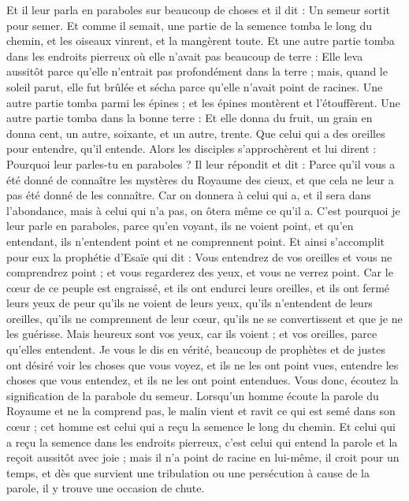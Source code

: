 \begin{multicols}{2}
Et il leur parla en paraboles sur beaucoup de choses et il dit : Un semeur sortit pour semer.
Et comme il semait, une partie de la semence tomba le long du chemin, et les oiseaux vinrent, et la mangèrent toute.
Et une autre partie tomba dans les endroits pierreux où elle n'avait pas beaucoup de terre : Elle leva aussitôt parce qu'elle n'entrait pas profondément dans la terre ;
mais, quand le soleil parut, elle fut brûlée et sécha parce qu'elle n'avait point de racines.
Une autre partie tomba parmi les épines ; et les épines montèrent et l'étouffèrent.
Une autre partie tomba dans la bonne terre : Et elle donna du fruit, un grain en donna cent, un autre, soixante, et un autre, trente.
Que celui qui a des oreilles pour entendre, qu'il entende.
Alors les disciples s'approchèrent et lui dirent : Pourquoi leur parles-tu en paraboles ?
Il leur répondit et dit : Parce qu'il vous a été donné de connaître les mystères du Royaume des cieux, et que cela ne leur a pas été donné de les connaître.
Car on donnera à celui qui a, et il sera dans l'abondance, mais à celui qui n'a pas, on ôtera même ce qu'il a.
C'est pourquoi je leur parle en paraboles, parce qu'en voyant, ils ne voient point, et qu'en entendant, ils n'entendent point et ne comprennent point.
Et ainsi s'accomplit pour eux la prophétie d'Esaïe qui dit : Vous entendrez de vos oreilles et vous ne comprendrez point ; et vous regarderez des yeux, et vous ne verrez point.
Car le cœur de ce peuple est engraissé, et ils ont endurci leurs oreilles, et ils ont fermé leurs yeux de peur qu'ils ne voient de leurs yeux, qu'ils n'entendent de leurs oreilles, qu'ils ne comprennent de leur cœur, qu'ils ne se convertissent et que je ne les guérisse.
Mais heureux sont vos yeux, car ils voient ; et vos oreilles, parce qu'elles entendent.
Je vous le dis en vérité, beaucoup de prophètes et de justes ont désiré voir les choses que vous voyez, et ils ne les ont point vues, entendre les choses que vous entendez, et ils ne les ont point entendues.
Vous donc, écoutez la signification de la parabole du semeur.
Lorsqu'un homme écoute la parole du Royaume et ne la comprend pas, le malin vient et ravit ce qui est semé dans son cœur ; cet homme est celui qui a reçu la semence le long du chemin.
Et celui qui a reçu la semence dans les endroits pierreux, c'est celui qui entend la parole et la reçoit aussitôt avec joie ;
mais il n'a point de racine en lui-même, il croit pour un temps, et dès que survient une tribulation ou une persécution à cause de la parole, il y trouve une occasion de chute.

\end{multicols}
